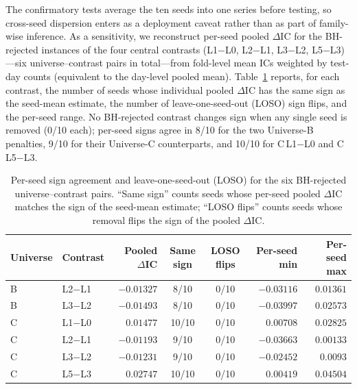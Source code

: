 \documentclass{article}
\begin{document}
The confirmatory tests average the ten seeds into one series before testing, so
cross-seed dispersion enters as a deployment caveat rather than as part of
family-wise inference. As a sensitivity, we reconstruct per-seed pooled
$\Delta$IC for the BH-rejected instances of the four central contrasts
(L1$-$L0, L2$-$L1, L3$-$L2, L5$-$L3)---six universe--contrast pairs in
total---from fold-level mean ICs weighted by test-day counts (equivalent to the
day-level pooled mean).
Table~\ref{app:robust:tab-seeds} reports, for each contrast, the number of seeds
whose individual pooled $\Delta$IC has the same sign as the seed-mean estimate,
the number of leave-one-seed-out (LOSO) sign flips, and the per-seed range. No
BH-rejected contrast changes sign when any single seed is removed (0/10 each);
per-seed signs agree in 8/10 for the two Universe-B penalties, 9/10 for their
Universe-C counterparts, and 10/10 for C\,L1$-$L0 and C\,L5$-$L3.

\begin{table}[h]
  \centering
  \caption{Per-seed sign agreement and leave-one-seed-out (LOSO) for the six
  BH-rejected universe--contrast pairs. ``Same sign'' counts seeds whose per-seed pooled
  $\Delta$IC matches the sign of the seed-mean estimate; ``LOSO flips'' counts
  seeds whose removal flips the sign of the pooled $\Delta$IC.}
  \label{app:robust:tab-seeds}
  {\small
  \setlength{\tabcolsep}{4pt}
  \begin{tabular}{@{}llrccrr@{}}
    \toprule
    Universe & Contrast & Pooled $\Delta$IC & Same sign & LOSO flips & Per-seed min & Per-seed max \\
    \midrule
    B & L2$-$L1 & $-0.01327$ & 8/10  & 0/10 & $-0.03116$ & $0.01361$ \\
    B & L3$-$L2 & $-0.01493$ & 8/10  & 0/10 & $-0.03997$ & $0.02573$ \\
    C & L1$-$L0 & $0.01477$  & 10/10 & 0/10 & $0.00708$  & $0.02825$ \\
    C & L2$-$L1 & $-0.01193$ & 9/10  & 0/10 & $-0.03663$ & $0.00133$ \\
    C & L3$-$L2 & $-0.01231$ & 9/10  & 0/10 & $-0.02452$ & $0.0093$  \\
    C & L5$-$L3 & $0.02747$  & 10/10 & 0/10 & $0.00419$  & $0.04504$ \\
    \bottomrule
  \end{tabular}}
\end{table}
\end{document}
